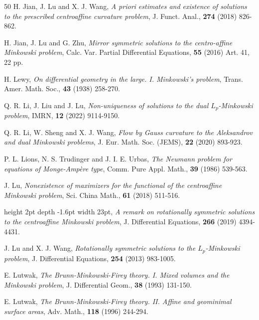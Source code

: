 \documentclass[11pt]{amsart}
\numberwithin{equation} {section}
\numberwithin{equation}{section}
\begin{document}
\begin{thebibliography}{50}
H. Jian, J. Lu and X. J. Wang, \emph{A priori estimates and existence of solutions to the prescribed centroaffine curvature problem}, J. Funct. Anal., {\bf 274} (2018) 826-862.

H. Jian, J. Lu and G. Zhu, \emph{Mirror symmetric solutions to the
  centro-affine Minkowski problem}, Calc. Var. Partial Differential
  Equations, {\bf 55} (2016) Art. 41, 22 pp.

 H. Lewy, \emph{On differential geometry in the large. I. Minkowski's problem}, Trans. Amer. Math. Soc., {\bf 43} (1938) 258-270.

Q. R. Li, J. Liu and J. Lu, \emph{Non-uniqueness of solutions to the dual $L_p$-Minkowski problem}, IMRN, {\bf 12} (2022) 9114-9150.

Q. R. Li, W. Sheng and X. J. Wang, \emph{Flow by Gauss curvature to the Aleksandrov and dual Minkowski problems}, J. Eur. Math. Soc. (JEMS), {\bf 22} (2020) 893-923.


P. L. Lions, N. S. Trudinger and J. I. E. Urbas, \emph{The Neumann problem for equations of Monge-Amp\`ere type}, Comm. Pure Appl. Math., {\bf 39} (1986) 539-563.

J. Lu, \emph{Nonexistence of maximizers for the functional of the
  centroaffine Minkowski problem}, Sci. China Math., {\bf 61} (2018) 511-516.

\leavevmode\vrule height 2pt depth -1.6pt width 23pt, \emph{A remark on rotationally symmetric solutions to the centroaffine Minkowski problem}, J. Differential Equations, {\bf 266} (2019) 4394-4431.

J. Lu and X. J. Wang, \emph{Rotationally symmetric solutions to the $L_p$-Minkowski problem}, J. Differential Equations, {\bf 254} (2013) 983-1005.

E. Lutwak, \emph{The Brunn-Minkowski-Firey theory. I. Mixed volumes and the Minkowski problem}, J. Differential Geom., {\bf 38} (1993) 131-150.

E. Lutwak, \emph{The Brunn-Minkowski-Firey theory. II. Affine and geominimal surface areas}, Adv. Math., {\bf 118} (1996) 244-294.


\end{thebibliography}
\end{document}
